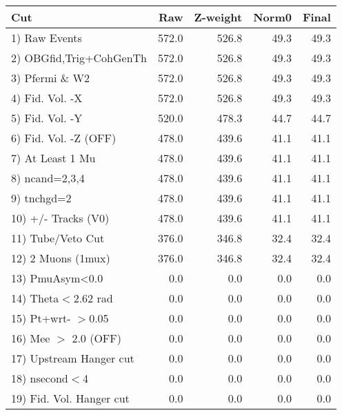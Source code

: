  \begin{table}[h!]\centering
 \begin{tabular}{||l||r|r|r|r||}
 \hline
 \hline
 Cut & Raw & Z-weight & Norm0 & Final \\
 \hline
  1) Raw Events           &       572.0 &       526.8 &        49.3 &        49.3 \\
  2) OBGfid,Trig+CohGenTh &       572.0 &       526.8 &        49.3 &        49.3 \\
  3) Pfermi \& W2         &       572.0 &       526.8 &        49.3 &        49.3 \\
  4) Fid. Vol. -X         &       572.0 &       526.8 &        49.3 &        49.3 \\
  5) Fid. Vol. -Y         &       520.0 &       478.3 &        44.7 &        44.7 \\
  6) Fid. Vol. -Z (OFF)   &       478.0 &       439.6 &        41.1 &        41.1 \\
  7) At Least 1 Mu        &       478.0 &       439.6 &        41.1 &        41.1 \\
  8) ncand=2,3,4          &       478.0 &       439.6 &        41.1 &        41.1 \\
  9) tnchgd=2             &       478.0 &       439.6 &        41.1 &        41.1 \\
 10) +/- Tracks (V0)      &       478.0 &       439.6 &        41.1 &        41.1 \\
 11) Tube/Veto Cut        &       376.0 &       346.8 &        32.4 &        32.4 \\
 12) 2 Muons (1mux)       &       376.0 &       346.8 &        32.4 &        32.4 \\
 13) PmuAsym<0.0          &         0.0 &         0.0 &         0.0 &         0.0 \\
 14) Theta$<$2.62 rad     &         0.0 &         0.0 &         0.0 &         0.0 \\
 15) Pt+wrt- $>$0.05      &         0.0 &         0.0 &         0.0 &         0.0 \\
 16) Mee $>$ 2.0  (OFF)   &         0.0 &         0.0 &         0.0 &         0.0 \\
 17) Upstream Hanger cut  &         0.0 &         0.0 &         0.0 &         0.0 \\
 18) nsecond$<$4          &         0.0 &         0.0 &         0.0 &         0.0 \\
 19) Fid. Vol. Hanger cut &         0.0 &         0.0 &         0.0 &         0.0 \\

\end{tabular}
\end{table}
